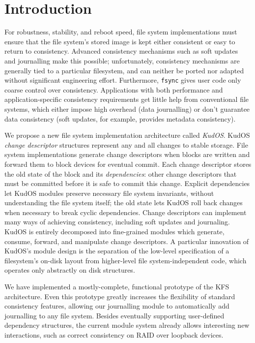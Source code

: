 
\section*{Introduction}
\label{sec:intro}

For robustness, stability, and reboot speed, file system implementations
must ensure that the file system's stored image is kept either consistent
or easy to return to consistency.
%
Advanced consistency mechanisms such as soft updates~\cite{ganger00soft}
and journalling make this possible; unfortunately,
%
%
consistency mechanisms are generally tied to a particular filesystem, and
can neither be ported nor adapted without significant engineering
effort.
%
Furthermore, \verb+fsync+ gives user code only coarse control over
consistency.
%
Applications with both performance and application-specific consistency
requirements get little help from conventional file systems, which either
impose high overhead (data journalling) or don't guarantee data consistency
(soft updates, for example, provides metadata consistency).



We propose a new file system implementation architecture called
\emph{KudOS}.
%
KudOS \emph{change descriptor} structures represent any and all changes to
stable storage.
%
File system implementations generate change descriptors when blocks are
written and forward them to block devices for eventual commit.
%
Each change descriptor stores the old state of the block and its
\emph{dependencies}: other change descriptors that must be committed before
it is safe to commit this change.
%
Explicit dependencies let KudOS modules preserve necessary file system
invariants, without understanding the file system itself; the old state
lets KudOS roll back changes when necessary to break cyclic dependencies.
%
Change descriptors can implement many ways of achieving
consistency, including soft updates and journaling.
%
%
%
KudOS is entirely decomposed into fine-grained modules which generate,
consume, forward, and manipulate change descriptors.
%
A particular innovation of KudOS's module design is the separation of the
low-level specification of a filesystem's on-disk layout from higher-level
file system-independent code, which operates only abstractly on disk
structures.

We have implemented a mostly-complete, functional prototype of the KFS
architecture.  Even this prototype greatly increases the
flexibility of standard consistency features, allowing our journalling
module to automatically add journalling to any file system. 
%
%
Besides eventually supporting user-defined dependency structures, the
current module system already allows interesting new interactions, such as
correct consistency on RAID over loopback devices.

